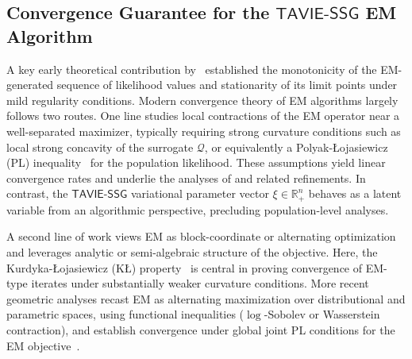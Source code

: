 \documentclass[12pt]{article}
\numberwithin{equation}{section}
\newcommand{\tssg}{\mathsf{TAVIE}\text{-}\mathsf{SSG}}
\begin{document}

\subsection{Convergence Guarantee for the \texorpdfstring{$\tssg$}{TAVIE-SSG} EM Algorithm}\label{subsec:algorithmic-convergence}

A key early theoretical contribution by~\cite{wu1983convergence} established the monotonicity of the EM-generated sequence of likelihood values and stationarity of its limit points under mild regularity conditions. Modern convergence theory of EM algorithms largely follows two routes. One line studies local contractions of the EM operator near a well-separated maximizer, typically requiring strong curvature conditions such as local strong concavity of the surrogate $\mathcal Q$, or equivalently a Polyak-{\L}ojasiewicz (PL) inequality~\citep{Polyak1963,lojasiewicz1963propriete} for the population likelihood. These assumptions yield linear convergence rates and underlie the analyses of \cite{balakrishnan2017statistical} and related refinements.  In contrast, the $\tssg$ variational parameter vector $\xi\in \mathbb{R}_{+}^{n}$ behaves as a latent variable from an algorithmic perspective, precluding population-level analyses.

A second line of work views EM as block-coordinate or alternating
optimization and leverages analytic or semi-algebraic structure of the
objective. Here, the Kurdyka-{\L}ojasiewicz (K\L) property~\citep{lojasiewicz1963propriete,kurdyka1998gradients} is central in proving convergence of EM-type iterates under substantially
weaker curvature conditions. More recent geometric analyses recast EM as alternating maximization over distributional and parametric spaces, using functional inequalities ($\log$-Sobolev or Wasserstein contraction), and establish convergence under global joint PL conditions for the EM objective~\citep{caprio2025fast}.
\end{document}
